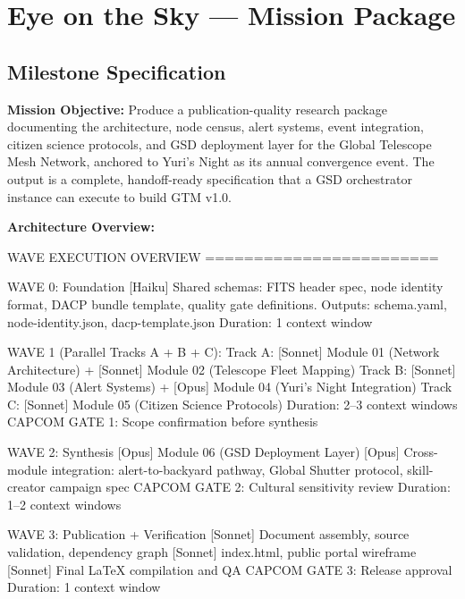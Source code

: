 \documentclass[11pt,letterpaper]{article}
\begin{document}
\section{Eye on the Sky --- Mission Package}

\subsection{Milestone Specification}

\textbf{Mission Objective:} Produce a publication-quality research package documenting the architecture, node census, alert systems, event integration, citizen science protocols, and GSD deployment layer for the Global Telescope Mesh Network, anchored to Yuri's Night as its annual convergence event. The output is a complete, handoff-ready specification that a GSD orchestrator instance can execute to build GTM v1.0.

\textbf{Architecture Overview:}

\begin{asciibox}
WAVE EXECUTION OVERVIEW
========================

  WAVE 0: Foundation
  [Haiku] Shared schemas: FITS header spec, node identity format,
          DACP bundle template, quality gate definitions.
          Outputs: schema.yaml, node-identity.json, dacp-template.json
          Duration: 1 context window

  WAVE 1 (Parallel Tracks A + B + C):
  Track A: [Sonnet] Module 01 (Network Architecture) +
           [Sonnet] Module 02 (Telescope Fleet Mapping)
  Track B: [Sonnet] Module 03 (Alert Systems) +
           [Opus]   Module 04 (Yuri's Night Integration)
  Track C: [Sonnet] Module 05 (Citizen Science Protocols)
           Duration: 2--3 context windows
           CAPCOM GATE 1: Scope confirmation before synthesis

  WAVE 2: Synthesis
  [Opus]  Module 06 (GSD Deployment Layer)
  [Opus]  Cross-module integration: alert-to-backyard pathway,
          Global Shutter protocol, skill-creator campaign spec
          CAPCOM GATE 2: Cultural sensitivity review
          Duration: 1--2 context windows

  WAVE 3: Publication + Verification
  [Sonnet] Document assembly, source validation, dependency graph
  [Sonnet] index.html, public portal wireframe
  [Sonnet] Final LaTeX compilation and QA
          CAPCOM GATE 3: Release approval
          Duration: 1 context window
\end{asciibox}
\end{document}
